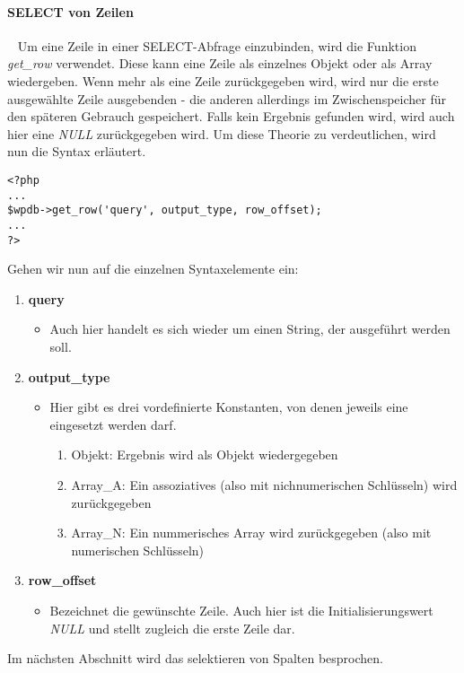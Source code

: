 \paragraph{SELECT von Zeilen}\label{SELEZEI}\ \newline
Um eine Zeile in einer SELECT-Abfrage einzubinden, wird die Funktion \emph{get\_row} verwendet. Diese kann eine Zeile als einzelnes Objekt oder als Array wiedergeben. Wenn mehr als eine Zeile zurückgegeben wird, wird nur die erste ausgewählte Zeile ausgebenden - die anderen allerdings im Zwischenspeicher für den späteren Gebrauch gespeichert. Falls kein Ergebnis gefunden wird, wird auch hier eine \emph{NULL} zurückgegeben wird. Um diese Theorie zu verdeutlichen, wird nun die Syntax erläutert. 
\begin{lstlisting}
<?php 
...
$wpdb->get_row('query', output_type, row_offset); 
...
?> 
\end{lstlisting}
Gehen wir nun auf die einzelnen Syntaxelemente ein:
\begin{enumerate}
	\item {\bf query}
	\begin{itemize}
		\item Auch hier handelt es sich wieder um einen String, der ausgeführt werden soll.
	\end{itemize}
	\item {\bf output\_type }
	\begin{itemize}
		\item Hier gibt es drei vordefinierte Konstanten, von denen jeweils eine eingesetzt werden darf. 
		\begin{enumerate}
			\item Objekt: Ergebnis wird als Objekt wiedergegeben
			\item Array\_A: Ein assoziatives (also mit nichnumerischen Schlüsseln) wird zurückgegeben
			\item Array\_N: Ein nummerisches Array wird zurückgegeben (also mit numerischen Schlüsseln)
		\end{enumerate} 
	\end{itemize}
	\item {\bf row\_offset }
	\begin{itemize}
		\item Bezeichnet die gewünschte Zeile. Auch hier ist die Initialisierungswert \emph{NULL} und stellt zugleich die erste Zeile dar. 
	\end{itemize}
\end{enumerate}
Im nächsten Abschnitt wird das selektieren von Spalten besprochen.
